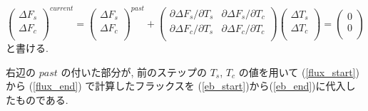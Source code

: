 \begin{equation}
 \left(
\begin{array}{l}
 \Delta F_s \\
 \Delta F_c \\
\end{array}
\right)^{current}
=
\left(
\begin{array}{l}
 \Delta F_s \\
 \Delta F_c \\
\end{array}
\right)^{past}
+
\left(
\begin{array}{ll}
 {\partial \Delta F_s}/{\partial T_s} & 
 {\partial \Delta F_s}/{\partial T_c} \\
 {\partial \Delta F_c}/{\partial T_s} & 
 {\partial \Delta F_c}/{\partial T_c} \\
\end{array}
\right)
\left(
\begin{array}{l}
 \Delta T_s \\
 \Delta T_c \\
\end{array}
\right)
= 
\left(
\begin{array}{l}
 0 \\
 0 \\
\end{array}
\right)
\label{eb1}
\end{equation}
と書ける. 

右辺の $past$ の付いた部分が, 
前のステップの $T_s$, $T_c$ の値を用いて (\ref{flux_start})から
(\ref{flux_end}) で計算したフラックスを
(\ref{eb_start})から(\ref{eb_end})に代入したものである. 

